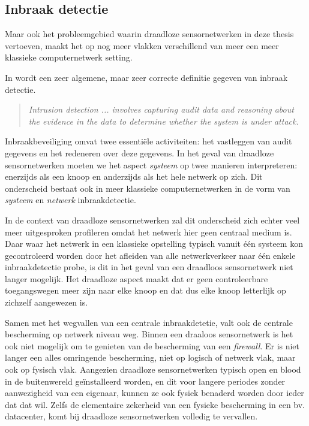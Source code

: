 \subsection{Inbraak detectie}

Maar ook het probleemgebied waarin draadloze sensornetwerken in deze thesis
vertoeven, maakt het op nog meer vlakken verschillend van meer een meer
klassieke computernetwerk setting.

In \cite{zhang2000intrusion} wordt een zeer algemene, maar zeer correcte
definitie gegeven van inbraak detectie.

\begin{quote}
\emph{Intrusion detection ... involves capturing audit data and reasoning about
the evidence in the data to determine whether the system is under attack.}
\end{quote}

Inbraakbeveiliging omvat twee essenti\"ele activiteiten: het vastleggen van
audit gegevens en het redeneren over deze gegevens. In het geval van draadloze
sensornetwerken moeten we het aspect \emph{systeem} op twee manieren
interpreteren: enerzijds als een knoop en anderzijds als het hele netwerk op
zich. Dit onderscheid bestaat ook in meer klassieke computernetwerken in de
vorm van \emph{systeem} en \emph{netwerk} inbraakdetectie.

In de context van draadloze sensornetwerken zal dit onderscheid zich echter
veel meer uitgesproken profileren omdat het netwerk hier geen centraal medium
is. Daar waar het netwerk in een klassieke opstelling typisch vanuit \'e\'en
systeem kon gecontroleerd worden door het afleiden van alle netwerkverkeer naar
\'e\'en enkele inbraakdetectie probe, is dit in het geval van een draadloos
sensornetwerk niet langer mogelijk. Het draadloze aspect maakt dat er geen
controleerbare toegangswegen meer zijn naar elke knoop en dat dus elke knoop
letterlijk op zichzelf aangewezen is.

Samen met het wegvallen van een centrale inbraakdetetie, valt ook de centrale
bescherming op netwerk niveau weg. Binnen een draaloos sensornetwerk is het ook
niet mogelijk om te genieten van de bescherming van een \emph{firewall}. Er is
niet langer een alles omringende bescherming, niet op logisch of netwerk vlak,
maar ook op fysisch vlak. Aangezien draadloze sensornetwerken typisch open en
blood in de buitenwereld ge\"installeerd worden, en dit voor langere periodes
zonder aanwezigheid van een eigenaar, kunnen ze ook fysiek benaderd worden door
ieder dat dat wil. Zelfs de elementaire zekerheid van een fysieke bescherming
in een bv. datacenter, komt bij draadloze sensornetwerken volledig te vervallen.

